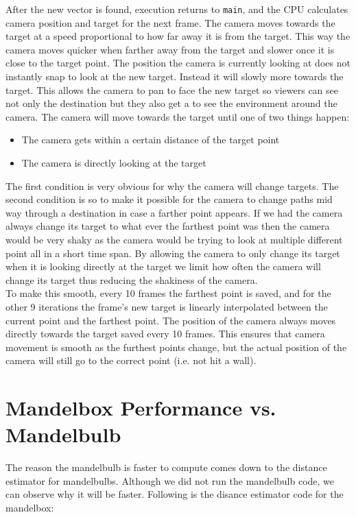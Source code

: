 \documentclass[11pt]{article}
\begin{document}
After the new vector is found, execution returns to \texttt{main}, and the CPU calculates camera position and target for the next frame. The camera moves towards the target at a speed proportional to how far away it is from the target. This way the camera moves quicker when farther away from the target and slower once it is close to the target point. The position the camera is currently looking at does not instantly snap to look at the new target. Instead it will slowly more towards the target. This allows the camera to pan to face the new target so viewers can see not only the destination but they also get a to see the environment around the camera. The camera will move towards the target until one of two things happen:
\begin{itemize}
\item The camera gets within a certain distance of the target point
\item The camera is directly looking at the target
\end{itemize}
The first condition is very obvious for why the camera will change targets. The second condition is so to make it possible for the camera to change paths mid way through a destination in case a farther point appears. If we had the camera always change its target to what ever the farthest point was then the camera would be very shaky as the camera would be trying to look at multiple different point all in a short time span. By allowing the camera to only change its target when it is looking directly at the target we limit how often the camera will change its target thus reducing the shakiness of the camera.\\


To make this smooth, every 10 frames the farthest point is saved, and for the other 9 iterations the frame's new target is linearly interpolated between the current point and the farthest point. The position of the camera always moves directly towards the target saved every 10 frames. This ensures that camera movement is smooth as the furthest points change, but the actual position of the camera will still go to the correct point (i.e. not hit a wall).

\section{Mandelbox Performance vs. Mandelbulb}
The reason the mandelbulb is faster to compute comes down to the distance estimator for mandelbulbs. Although we did not run the mandelbulb code, we can observe why it will be faster. Following is the disance estimator code for the mandelbox:

\end{document}
